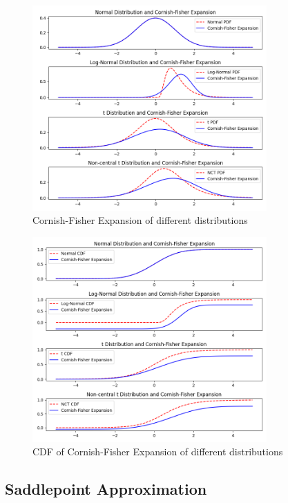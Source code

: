 \begin{figure}[h]
    \centering
    \includegraphics[width=0.8\textwidth]{img/cf_expansion.png}
    \caption{Cornish-Fisher Expansion of different distributions}
    \label{fig:cf_expansion}
\end{figure}

\begin{figure}[h]
    \centering
    \includegraphics[width=0.8\textwidth]{img/cf_expansion_cdf.png}
    \caption{CDF of Cornish-Fisher Expansion of different distributions}
    \label{fig:cf_expansion_cdf}
\end{figure}

\subsection{Saddlepoint Approximation}

